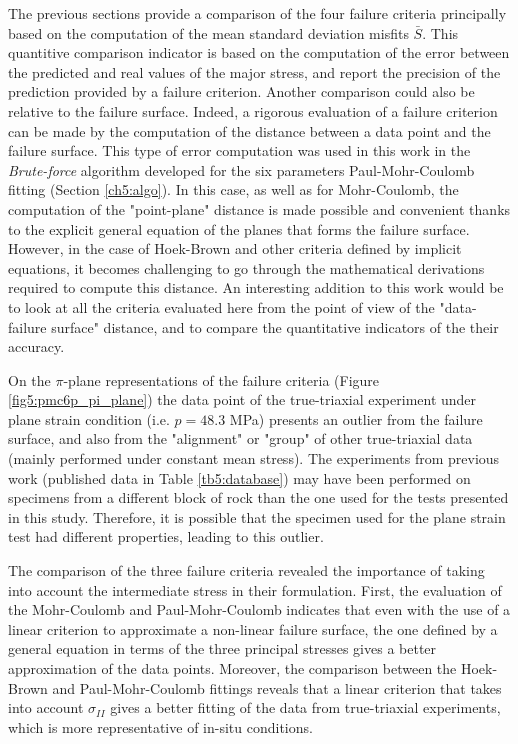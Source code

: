 The previous sections provide a comparison of the four failure criteria principally based on the computation of the mean standard deviation misfits $\bar{S}$. This quantitive comparison indicator is based on the computation of the error between the predicted and real values of the major stress, and report the precision of the prediction provided by a failure criterion. Another comparison could also be relative to the failure surface. Indeed, a rigorous evaluation  of a failure criterion can be made by the computation of the distance between a data point and the failure surface. This type of error computation was used in this work in the \emph{Brute-force} algorithm developed for the six parameters Paul-Mohr-Coulomb fitting (Section \ref{ch5:algo}). In this case, as well as for Mohr-Coulomb, the computation of the "point-plane" distance is made possible and convenient thanks to the explicit general equation of the planes that forms the failure surface. However, in the case of Hoek-Brown and other criteria defined by implicit equations, it becomes challenging to go through the mathematical derivations required to compute this distance. An interesting addition to this work would be to look at all the criteria evaluated here from the point of view of the "data-failure surface" distance, and to compare the quantitative indicators of the their accuracy.

On the $\pi$-plane representations of the failure criteria (Figure \ref{fig5:pmc6p_pi_plane}) the data point of the true-triaxial experiment under plane strain condition (i.e. $p = 48.3$ \si{MPa}) presents an outlier from the failure surface, and also from the "alignment" or "group" of other true-triaxial data (mainly performed under constant mean stress). The experiments from previous work (published data in Table \ref{tb5:database}) may have been performed on specimens from a different block of rock than the one used for the tests presented in this study. Therefore, it is possible that the specimen used for the plane strain test had different properties, leading to this outlier. 

The comparison of the three failure criteria revealed the importance of taking into account the intermediate stress in their formulation. First, the evaluation of the Mohr-Coulomb and Paul-Mohr-Coulomb indicates that even with the use of a linear criterion to approximate a non-linear failure surface, the one defined by a general equation in terms of the three principal stresses gives a better approximation of the data points. Moreover, the comparison between the Hoek-Brown and Paul-Mohr-Coulomb fittings reveals that a linear criterion that takes into account $\sigma_{II}$ gives a better fitting of the data from true-triaxial experiments, which is more representative of in-situ conditions. 

